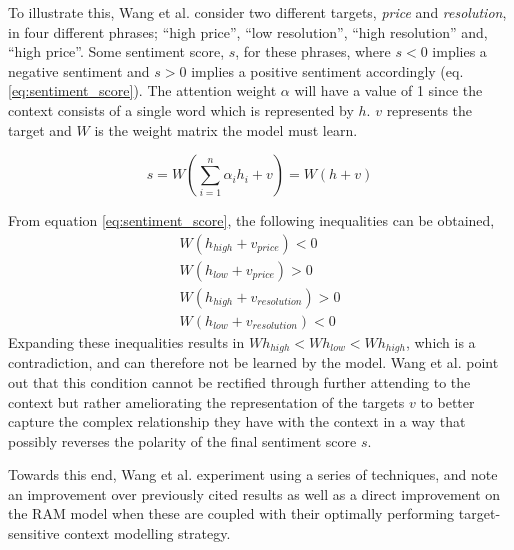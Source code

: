 \documentclass[../../fyp.tex]{subfiles}
\begin{document}
To illustrate this, Wang et al. \cite{wang2018} consider two different targets, \textit{price} and \textit{resolution}, in four different phrases; \enquote{high price}, \enquote{low resolution}, \enquote{high resolution} and, \enquote{high price}. Some sentiment score, $s$, for these phrases, where $s < 0$ implies a negative sentiment and $s > 0$ implies a positive sentiment accordingly (eq. \ref{eq:sentiment_score}). The attention weight $\alpha$ will have a value of 1 since the context consists of a single word which is represented by $h$. $v$ represents the target and $W$ is the weight matrix the model must learn.

\begin{equation} \label{eq:sentiment_score}
	s = W(\sum_{i=1}^{n}\alpha_{i}h_{i}+v) = W(h+v)
\end{equation}

From equation \ref{eq:sentiment_score}, the following inequalities can be obtained,
\begin{equation*}
	\begin{split}
		W(h_{high}+v_{price}) < 0 \\
		W(h_{low}+v_{price}) > 0 \\
		W(h_{high}+v_{resolution}) > 0 \\
		W(h_{low}+v_{resolution}) < 0
	\end{split}
\end{equation*}
Expanding these inequalities results in $Wh_{high}<Wh_{low}<Wh_{high}$, which is a contradiction, and can therefore not be learned by the model. Wang et al. \cite{wang2018} point out that this condition cannot be rectified through further attending to the context but rather ameliorating the representation of the targets $v$ to better capture the complex relationship they have with the context in a way that possibly reverses the polarity of the final sentiment score $s$.

Towards this end, Wang et al. \cite{wang2018} experiment using a series of techniques, and note an improvement over previously cited results as well as a direct improvement on the RAM model \cite{chen2017} when these are coupled with their optimally performing target-sensitive context modelling strategy.

\end{document}
